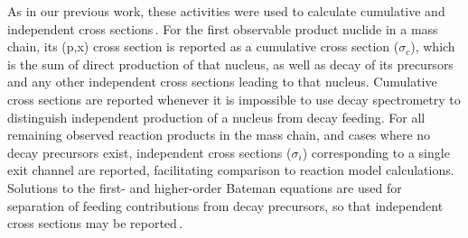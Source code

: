 As in our previous work, these activities were used to calculate 
cumulative and independent cross sections\,\cite{Voyles2018a}.
For the first observable product nuclide in a mass chain, its (p,x) cross section is reported as a cumulative cross section ($\sigma_c$), which is the sum of direct production of that nucleus, as well as decay of its  precursors and any other independent cross sections leading to that nucleus. 
Cumulative cross sections are reported whenever it is impossible to use decay spectrometry to distinguish independent production of a nucleus from decay feeding.
For all remaining observed reaction products in the mass chain, and cases where no decay precursors exist, independent cross sections  ($\sigma_i$) corresponding to a single exit channel are reported, 
facilitating comparison to reaction model calculations.  
Solutions to the first- and higher-order  Bateman equations are used for separation of  feeding contributions from decay precursors, so that  independent cross sections may be reported\,\cite{bateman1910solution,Cetnar2006}.







